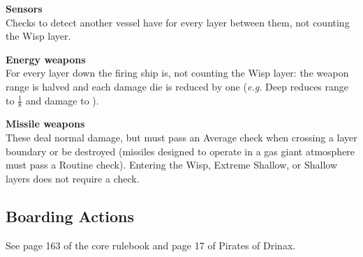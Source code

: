 \documentclass{cheatsheet}
\begin{document}
\begin{multicols}{3}
\textbf{Sensors}\\
Checks to detect another vessel have  for every layer
between them, not counting the Wisp layer.

\textbf{Energy weapons}\\
For every layer down the firing ship is, not counting the Wisp layer:
the weapon range is halved and each damage die is reduced by one
(\textit{e.g.} Deep reduces range to $\frac{1}{8}$ and damage to
).

\textbf{Missile weapons}\\
These deal normal damage, but must pass an Average check when crossing
a layer boundary or be destroyed (missiles designed to operate in a
gas giant atmosphere must pass a Routine check).  Entering the Wisp,
Extreme Shallow, or Shallow layers does not require a check.

\subsection{Boarding Actions}

See page 163 of the core rulebook and page 17 of Pirates of Drinax.

\end{multicols}
\end{document}
